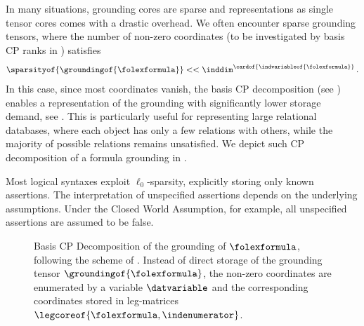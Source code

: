 In many situations, grounding cores are sparse and representations as single tensor cores comes with a drastic overhead.
We often encounter sparse grounding tensors, where the number of non-zero coordinates (to be investigated by basis CP ranks in ) satisfies
\begin{align*}
    \sparsityof{\groundingof{\folexformula}} << \inddim^{\cardof{\indvariableof{\folexformula}}} \, .
\end{align*}
In this case, since most coordinates vanish, the basis CP decomposition (see ) enables a representation of the grounding with significantly lower storage demand, see .
This is particularly useful for representing large relational databases, where each object has only a few relations with others, while the majority of possible relations remains unsatisfied.
We depict such CP decomposition of a formula grounding in .

Most logical syntaxes exploit $\ell_0$-sparsity, explicitly storing only known assertions.
The interpretation of unspecified assertions depends on the underlying assumptions.
Under the Closed World Assumption, for example, all unspecified assertions are assumed to be false.

\begin{figure}[t]
    \begin{center}
        
    \end{center}
    \caption{Basis CP Decomposition of the grounding of $\folexformula$, following the scheme of .
    Instead of direct storage of the grounding tensor $\groundingof{\folexformula}$, the non-zero coordinates are enumerated by a variable $\datvariable$ and the corresponding coordinates stored in leg-matrices $\legcoreof{\folexformula,\indenumerator}$.}
    \label{fig:groundingCP}
\end{figure}

